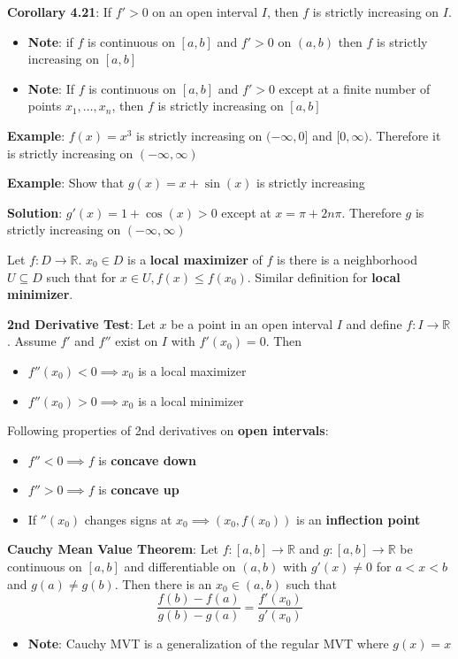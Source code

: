 \documentclass{article}
\begin{document}
      \textbf{Corollary 4.21}: If $f' > 0$ on an open interval $I$, then $f$ is strictly increasing on $I$.
      \begin{itemize}
        \item \textbf{Note}: if $f$ is continuous on $[a,b]$ and $f' > 0$ on $(a,b)$ then $f$ is strictly increasing on $[a,b]$
        \item \textbf{Note}: If $f$ is continuous on $[a,b]$ and $f' > 0$ except at a finite number of points $x_1, \ldots, x_n$, then $f$ is strictly increasing on $[a,b]$
      \end{itemize}
      \textbf{Example}: $f(x) = x^3$ is strictly increasing on $(- \infty, 0]$ and $[0, \infty)$. Therefore it is strictly increasing on $(- \infty, \infty)$

      \textbf{Example}: Show that $g(x) = x + \sin(x)$ is strictly increasing

      \textbf{Solution}: $g'(x) = 1 + \cos(x) > 0$ except at $x = \pi + 2n \pi$. Therefore $g$ is strictly increasing on $(-\infty, \infty)$ \bigskip

      Let $f \colon D \rightarrow \mathbb{R}$. $x_0 \in D$ is a \textbf{local maximizer} of $f$ is there is a neighborhood $U \subseteq D$ such that for $x \in U, f(x) \leq f(x_0)$. Similar definition for \textbf{local minimizer}.

      \textbf{2nd Derivative Test}: Let $x$ be a point in an open interval $I$ and define $f \colon I \rightarrow \mathbb{R}$. Assume $f'$ and $f''$ exist on $I$ with $f'(x_0) = 0$. Then
      \begin{itemize}
        \item $f''(x_0) < 0 \implies x_0$ is a local maximizer
        \item $f''(x_0) > 0 \implies x_0$ is a local minimizer \bigskip
      \end{itemize}
      Following properties of 2nd derivatives on \textbf{open intervals}:
      \begin{itemize}
        \item $f'' < 0 \implies f$ is \textbf{concave down}
        \item $f'' > 0 \implies f$ is \textbf{concave up}
        \item If $''(x_0)$ changes signs at $x_0 \implies (x_0, f(x_0))$ is an \textbf{inflection point} \bigskip
      \end{itemize}

      \textbf{Cauchy Mean Value Theorem}: Let $f \colon [a,b] \rightarrow \mathbb{R}$ and $g \colon [a,b] \rightarrow \mathbb{R}$ be continuous on $[a,b]$ and differentiable on $(a,b)$ with $g'(x) \neq 0$ for $a < x < b$ and $g(a) \neq g(b)$. Then there is an $x_0 \in (a,b)$ such that
      \[\frac{f(b) - f(a)}{g(b) - g(a)} = \frac{f'(x_0)}{g'(x_0)}\]
      \begin{itemize}
        \item \textbf{Note}: Cauchy MVT is a generalization of the regular MVT where $g(x) = x$
      \end{itemize}
\end{document}
